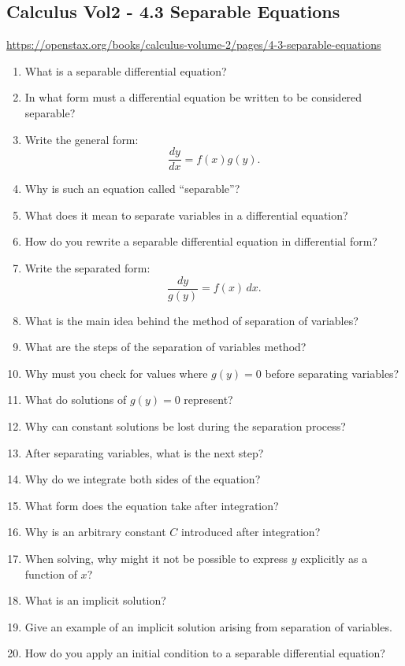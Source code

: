\subsection{Calculus Vol2 - 4.3 Separable Equations}

\url{https://openstax.org/books/calculus-volume-2/pages/4-3-separable-equations}

\begin{enumerate}
  \item What is a separable differential equation?
  \item In what form must a differential equation be written to be considered separable?
  \item Write the general form:
    \[
      \frac{dy}{dx} = f(x)g(y).
    \]
  \item Why is such an equation called “separable”?
  \item What does it mean to separate variables in a differential equation?
  \item How do you rewrite a separable differential equation in differential form?
  \item Write the separated form:
    \[
      \frac{dy}{g(y)} = f(x)\,dx.
    \]
  \item What is the main idea behind the method of separation of variables?
  \item What are the steps of the separation of variables method?
  \item Why must you check for values where $g(y)=0$ before separating variables?
  \item What do solutions of $g(y)=0$ represent?
  \item Why can constant solutions be lost during the separation process?
  \item After separating variables, what is the next step?
  \item Why do we integrate both sides of the equation?
  \item What form does the equation take after integration?
  \item Why is an arbitrary constant $C$ introduced after integration?
  \item When solving, why might it not be possible to express $y$ explicitly as a function of $x$?
  \item What is an implicit solution?
  \item Give an example of an implicit solution arising from separation of variables.
  \item How do you apply an initial condition to a separable differential equation?

\end{enumerate}
